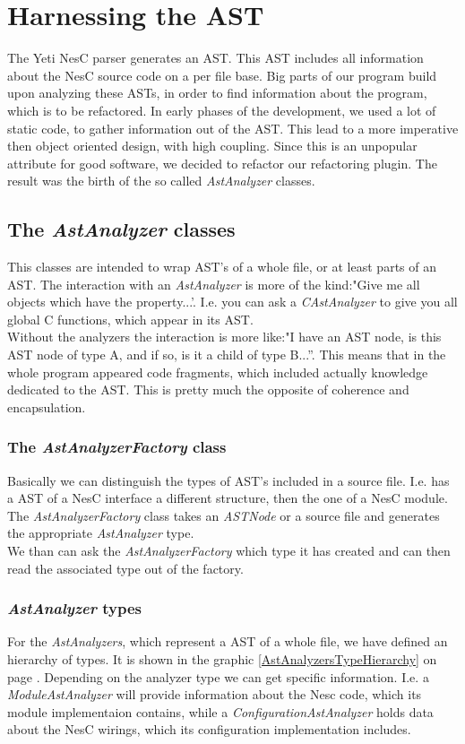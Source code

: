 \documentclass[a4paper,10pt]{report}
\begin{document}
\chapter{Harnessing the AST}
\label{harnessingTheAST}
The Yeti NesC parser generates an AST. This AST includes all information about the NesC source code on a per file base. Big parts of our program build upon analyzing these ASTs, in order to find information about the program, which is to be refactored.
In early phases of the development, we used a lot of static code, to gather information out of the AST. This lead to a more imperative then object oriented design, with high coupling. Since this is an unpopular attribute for good software, we decided to refactor our refactoring plugin. 
The result was the birth of the so called {\it AstAnalyzer} classes.

\section{The {\it AstAnalyzer} classes}
\label{AstAnalyzerClasses}
This classes are intended to wrap AST's of a whole file, or at least parts of an AST. The interaction with an {\it AstAnalyzer} is more of the kind:"Give me all objects which have the property...'. I.e. you can ask a {\it CAstAnalyzer} to give you all global C functions, which appear in its AST.\\
Without the analyzers the interaction is more like:"I have an AST node, is this AST node of type A, and if so, is it a child of type B...''. This means that in the whole program appeared code fragments, which included actually knowledge dedicated to the AST. This is pretty much the opposite of coherence and encapsulation.

\subsection{The {\it AstAnalyzerFactory} class}
Basically we can distinguish the types of AST's included in a source file. I.e. has a AST of a NesC interface a different structure, then the one of a NesC module.
The {\it AstAnalyzerFactory} class takes an {\it ASTNode} or a source file and generates the appropriate {\it AstAnalyzer} type.\\
We than can ask the {\it AstAnalyzerFactory} which type it has created and can then read the associated type out of the factory.

\subsection{{\it AstAnalyzer} types}
For the {\it AstAnalyzers}, which represent a AST of a whole file, we have defined an hierarchy of types. It is shown in the graphic
\ref{AstAnalyzersTypeHierarchy} on page \pageref{AstAnalyzersTypeHierarchy}. Depending on the analyzer type we can get specific information. 
I.e. a {\it ModuleAstAnalyzer} will provide information about the Nesc code, which its module implementaion contains, while a {\it ConfigurationAstAnalyzer} holds data about the NesC wirings, which its configuration implementation includes.
\end{document}
